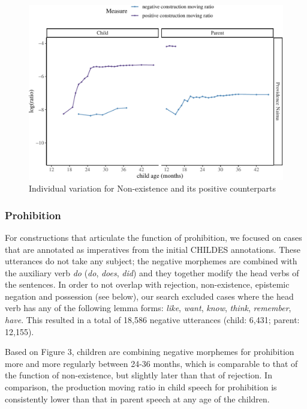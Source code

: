 \documentclass[
  english,
  man,floatsintext]{apa6}
\begin{document}
\begin{figure}[H]

{\centering \includegraphics{neg_construction_article_files/figure-latex/individualexistence-1} 

}

\caption{Individual variation for Non-existence and its positive counterparts}\label{fig:individualexistence}
\end{figure}

\hypertarget{prohibition}{%
\subsubsection{Prohibition}\label{prohibition}}

For constructions that articulate the function of prohibition, we focused on cases that are annotated as imperatives from the initial CHILDES annotations. These utterances do not take any subject; the negative morphemes are combined with the auxiliary verb \emph{do} (\emph{do}, \emph{does}, \emph{did}) and they together modify the head verbs of the sentences.
In order to not overlap with rejection, non-existence, epistemic negation and possession (see below), our search excluded cases where the head verb has any of the following lemma forms: \emph{like}, \emph{want}, \emph{know}, \emph{think}, \emph{remember}, \emph{have}. This resulted in a total of 18,586 negative utterances (child: 6,431; parent: 12,155).

Based on Figure 3, children are combining negative morphemes for prohibition more and more regularly between 24-36 months, which is comparable to that of the function of non-existence, but slightly later than that of rejection. In comparison, the production moving ratio in child speech for prohibition is consistently lower than that in parent speech at any age of the children.
\end{document}
